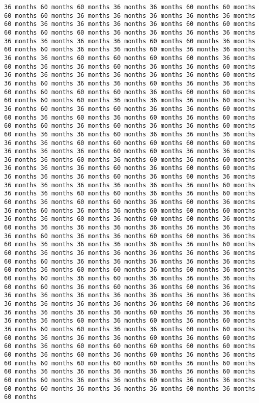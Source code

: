 \documentclass[11pt]{article}
\begin{document}
\begin{Verbatim}[commandchars=\\\{\}, frame=single, framerule=2mm, rulecolor=\color{outerrorbackground}]
36 months 60 months 60 months 36 months 36 months 60 months 60 months 60 months 60 months 36 months 36 months 36 months 36 months 36 months 60 months 36 months 36 months 36 months 36 months 60 months 60 months 60 months 60 months 60 months 36 months 36 months 36 months 36 months 36 months 36 months 36 months 36 months 60 months 60 months 36 months 60 months 60 months 36 months 36 months 60 months 36 months 36 months 36 months 36 months 60 months 60 months 60 months 60 months 36 months 60 months 36 months 36 months 60 months 36 months 36 months 60 months 36 months 36 months 36 months 36 months 36 months 36 months 60 months 36 months 60 months 36 months 36 months 60 months 36 months 36 months 60 months 60 months 60 months 60 months 36 months 60 months 60 months 60 months 60 months 60 months 36 months 36 months 36 months 60 months 36 months 60 months 36 months 60 months 36 months 36 months 60 months 60 months 36 months 60 months 36 months 60 months 36 months 60 months 60 months 60 months 36 months 60 months 36 months 36 months 60 months 60 months 36 months 36 months 60 months 36 months 36 months 36 months 36 months 36 months 60 months 60 months 60 months 60 months 60 months 36 months 36 months 36 months 60 months 60 months 36 months 36 months 36 months 36 months 60 months 36 months 60 months 36 months 60 months 36 months 36 months 36 months 60 months 36 months 60 months 60 months 36 months 36 months 36 months 60 months 36 months 60 months 36 months 36 months 36 months 36 months 36 months 36 months 36 months 60 months 36 months 36 months 60 months 60 months 36 months 36 months 60 months 60 months 36 months 60 months 60 months 36 months 60 months 36 months 36 months 60 months 36 months 36 months 60 months 60 months 60 months 36 months 36 months 60 months 36 months 60 months 60 months 36 months 60 months 36 months 36 months 36 months 36 months 36 months 36 months 36 months 60 months 36 months 36 months 60 months 60 months 36 months 60 months 36 months 36 months 36 months 36 months 36 months 60 months 60 months 36 months 36 months 36 months 36 months 36 months 36 months 60 months 60 months 36 months 36 months 36 months 36 months 36 months 60 months 36 months 60 months 60 months 36 months 60 months 36 months 60 months 60 months 36 months 60 months 36 months 36 months 36 months 60 months 60 months 36 months 60 months 36 months 60 months 36 months 36 months 36 months 36 months 36 months 36 months 36 months 36 months 36 months 36 months 36 months 36 months 36 months 60 months 36 months 36 months 36 months 36 months 36 months 60 months 36 months 36 months 36 months 36 months 60 months 36 months 60 months 36 months 60 months 36 months 60 months 60 months 36 months 36 months 60 months 60 months 60 months 36 months 36 months 36 months 60 months 36 months 60 months 60 months 36 months 60 months 60 months 60 months 60 months 60 months 60 months 36 months 60 months 36 months 60 months 36 months 36 months 60 months 60 months 60 months 60 months 60 months 36 months 60 months 60 months 36 months 36 months 36 months 36 months 36 months 60 months 60 months 60 months 36 months 36 months 60 months 36 months 36 months 60 months 60 months 36 months 36 months 36 months 60 months 36 months 60 months 
\end{Verbatim}
\end{document}
